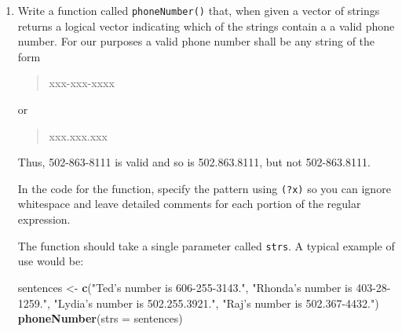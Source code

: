 \documentclass[]{book}
\makeatletter
\newenvironment{Shaded}{\begin{snugshade}}{\end{snugshade}}
\newcommand{\KeywordTok}[1]{\textcolor[rgb]{0.13,0.29,0.53}{\textbf{#1}}}
\newcommand{\DataTypeTok}[1]{\textcolor[rgb]{0.13,0.29,0.53}{#1}}
\newcommand{\StringTok}[1]{\textcolor[rgb]{0.31,0.60,0.02}{#1}}
\newcommand{\NormalTok}[1]{#1}
\newenvironment{kframe}{%
\medskip{}
\setlength{\fboxsep}{.8em}
 \def\at@end@of@kframe{}%
 \ifinner\ifhmode%
  \def\at@end@of@kframe{\end{minipage}}%
  \begin{minipage}{\columnwidth}%
 \fi\fi%
 \def\FrameCommand##1{\hskip\@totalleftmargin \hskip-\fboxsep
 \colorbox{shadecolor}{##1}\hskip-\fboxsep
     \hskip-\linewidth \hskip-\@totalleftmargin \hskip\columnwidth}%
 \MakeFramed {\advance\hsize-\width
   \@totalleftmargin\z@ \linewidth\hsize
   \@setminipage}}%
 {\par\unskip\endMakeFramed%
 \at@end@of@kframe}
\renewenvironment{Shaded}{\begin{kframe}}{\end{kframe}}
\theoremstyle{definition}
\theoremstyle{definition}
\theoremstyle{definition}
\theoremstyle{remark}
\makeatother
\begin{document}
{\begin{enumerate}
\begin{Shaded}
\begin{Highlighting}[]
\NormalTok{myText <-}\StringTok{ }\KeywordTok{c}\NormalTok{(}\StringTok{"Very short words."}\NormalTok{, }\StringTok{"Got a gargantuan word."}\NormalTok{, }\StringTok{"More short words!"}\NormalTok{)}
\KeywordTok{longWord2}\NormalTok{(}\DataTypeTok{strs =}\NormalTok{ myText)}
\end{Highlighting}
\end{Shaded}

\begin{verbatim}
## [[1]]
## character(0)
## 
## [[2]]
## [1] "gargantuan"
## 
## [[3]]
## character(0)
\end{verbatim}
\item
  Write a function called \texttt{phoneNumber()} that, when given a
  vector of strings returns a logical vector indicating which of the
  strings contain a a valid phone number. For our purposes a valid phone
  number shall be any string of the form

  \begin{quote}
  xxx-xxx-xxxx
  \end{quote}

  or

  \begin{quote}
  xxx.xxx.xxx
  \end{quote}

  Thus, 502-863-8111 is valid and so is 502.863.8111, but not
  502-863.8111.

  In the code for the function, specify the pattern using \texttt{(?x)}
  so you can ignore whitespace and leave detailed comments for each
  portion of the regular expression.

  The function should take a single parameter called \texttt{strs}. A
  typical example of use would be:

\begin{Shaded}
\begin{Highlighting}[]
\NormalTok{sentences <-}\StringTok{ }\KeywordTok{c}\NormalTok{(}\StringTok{"Ted's number is 606-255-3143."}\NormalTok{,}
               \StringTok{"Rhonda's number is 403-28-1259."}\NormalTok{,}
               \StringTok{"Lydia's number is 502.255.3921."}\NormalTok{,}
               \StringTok{"Raj's number is 502.367-4432."}\NormalTok{)}
\KeywordTok{phoneNumber}\NormalTok{(}\DataTypeTok{strs =}\NormalTok{ sentences)}
\end{Highlighting}
\end{Shaded}


\end{enumerate}}
\end{document}
